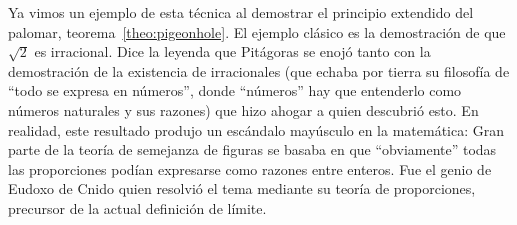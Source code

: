   Ya vimos un ejemplo de esta técnica
  al demostrar el principio extendido del palomar,
  teorema~\ref{theo:pigeonhole}.
  El ejemplo clásico es la demostración
  de que \(\sqrt{2}\) es irracional.
  Dice la leyenda que Pitágoras%
  se enojó tanto
  con la demostración de la existencia de irracionales
  (que echaba por tierra su filosofía
   de ``todo se expresa en números'',
   donde ``números'' hay que entenderlo
   como números naturales y sus razones)
  que hizo ahogar a quien descubrió esto.
  En realidad,
  este resultado produjo un escándalo mayúsculo en la matemática:
  Gran parte de la teoría de semejanza de figuras
  se basaba
  en que ``obviamente'' todas las proporciones podían expresarse
  como razones entre enteros.
  Fue el genio de Eudoxo de Cnido%
  quien resolvió el tema mediante su teoría de proporciones,
  precursor de la actual definición de límite.

